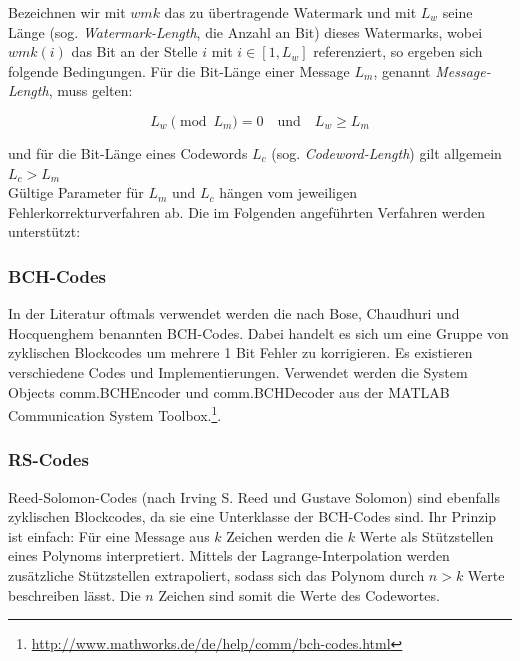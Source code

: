 Bezeichnen wir mit $wmk$ das zu übertragende Watermark und mit ${L}_{w}$ seine Länge (sog. \textit{Watermark-Length}, die Anzahl an Bit) dieses Watermarks, wobei $wmk(i)$ das Bit an der Stelle $i$ mit $i\in[1,{L}_{w}]$ referenziert, so ergeben sich folgende Bedingungen. Für die Bit-L\"ange einer Message ${L}_{m}$, genannt \textit{Message-Length}, muss gelten:

	 \begin{equation}
		 {L}_{w} \pmod{{L}_{m}} = 0 \quad\mbox{und}\quad {L}_{w}\geq{L}_{m} 		
		 \label{equ:wmkseqlength}
	 \end{equation} 

und für die Bit-Länge eines Codewords ${L}_{c}$ (sog. \textit{Codeword-Length}) gilt allgemein ${L}_{c} > {L}_{m}$
\\
Gültige Parameter für ${L}_{m}$ und ${L}_{c}$ hängen vom jeweiligen Fehlerkorrekturverfahren ab. Die im Folgenden angeführten Verfahren werden unterstützt:

\subsubsection{BCH-Codes}

In der Literatur\cite{chang2012location}\cite{huang2002blind} oftmals verwendet werden die nach Bose, Chaudhuri und Hocquenghem benannten BCH-Codes\cite{bose1960class}. Dabei handelt es sich um eine Gruppe von zyklischen Blockcodes um mehrere 1 Bit Fehler zu korrigieren. Es existieren verschiedene Codes und Implementierungen. Verwendet werden die System Objects \textsf{comm.BCHEncoder} und \textsf{comm.BCHDecoder} aus der MATLAB Communication System Toolbox.\footnote{\url{http://www.mathworks.de/de/help/comm/bch-codes.html}}.

\subsubsection{RS-Codes} 

Reed-Solomon-Codes\cite{reed1960polynomial} (nach Irving S. Reed und Gustave Solomon) sind ebenfalls zyklischen Blockcodes, da sie eine Unterklasse der BCH-Codes sind. Ihr Prinzip ist einfach: Für eine Message aus $k$ Zeichen werden die $k$ Werte als Stützstellen eines Polynoms interpretiert. Mittels der Lagrange-Interpolation werden zusätzliche Stützstellen extrapoliert, sodass sich das Polynom durch $n>k$ Werte beschreiben lässt. Die $n$ Zeichen sind somit die Werte des Codewortes.

